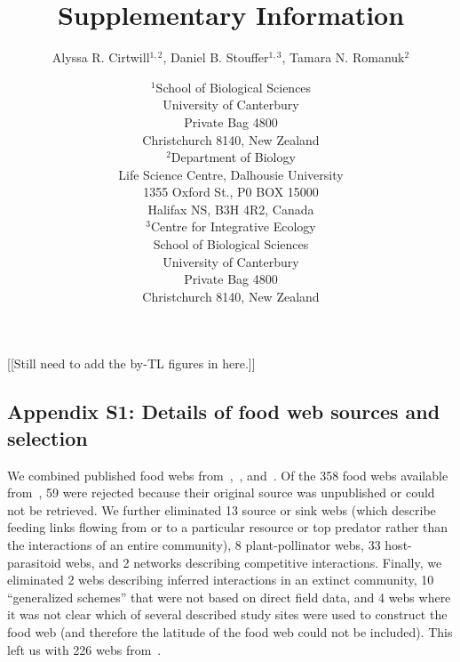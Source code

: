 \documentclass[12pt]{article}
\newcommand{\beginsupplement}{%
        \setcounter{table}{0}
        \renewcommand{\thetable}{S\arabic{table}}%
        \setcounter{figure}{0}
        \renewcommand{\thefigure}{S\arabic{figure}}%
     }
\begin{document}
\title{Supplementary Information}
\author{Alyssa R. Cirtwill$^{1,2}$, Daniel B. Stouffer$^{1,3}$, Tamara N. Romanuk$^{2}$}
\date{\footnotesize$^1$School of Biological Sciences\\University of Canterbury\\
Private Bag 4800\\Christchurch 8140, New Zealand \\
\medskip$^2$Department of Biology\\
Life Science Centre, Dalhousie University\\1355 Oxford St., P0 BOX 15000\\
Halifax NS, B3H 4R2, Canada\\
\medskip$^3$Centre for Integrative Ecology\\School of Biological Sciences\\University of Canterbury\\
Private Bag 4800\\Christchurch 8140, New Zealand \\}



\maketitle
\baselineskip=8.5mm

\vspace{0.4 in}
\beginsupplement
\linenumbers
[[Still need to add the by-TL figures in here.]]
\subsection*{Appendix S1: Details of food web sources and selection}

  We combined published food webs from~\citet{GlobalWeb},~\citet{Riede2011},
  and~\citet{Dunne2013}. Of the 358 food webs available
  from~\citet{GlobalWeb}, 59 were rejected because their original source was
  unpublished or could not be retrieved. We further eliminated 13 source or
  sink webs (which describe feeding links flowing from or to a particular
  resource or top predator rather than the interactions of an entire
  community), 8 plant-pollinator webs, 33 host-parasitoid webs, and 2 networks
  describing competitive interactions. Finally, we eliminated 2 webs
  describing  inferred interactions in an extinct community, 10 ``generalized
  schemes'' that were not based on direct field data, and 4 webs where it was
  not clear which of several described study sites were used to construct the
  food web (and therefore the latitude of the food web could not be
  included). This left us with 226 webs from~\citet{GlobalWeb}.
\end{document}
